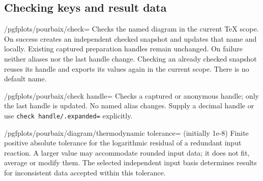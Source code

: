 \documentclass[a4paper,11pt]{ltxdoc}
\begin{document}
\subsection{Checking keys and result data}
\begin{key}{/pgfplots/pourbaix/check=}
Checks the named diagram in the current TeX scope. On success creates an
independent checked snapshot and updates that name and
\texttt{\string\pgfplotslastpourbaix} locally. Existing captured preparation handles
remain unchanged. On failure neither aliases nor the last handle change.
Checking an already checked snapshot reuses its handle and exports its values
again in the current scope. There is no default name.
\end{key}
\begin{key}{/pgfplots/pourbaix/check handle=}
Checks a captured or anonymous handle; only the last handle is updated.
No named alias changes. Supply a decimal handle or use
\texttt{check handle/.expanded=\string\myhandle} explicitly.
\end{key}
\begin{key}{/pgfplots/pourbaix/diagram/thermodynamic tolerance= (initially 1e-8)}
Finite positive absolute tolerance for the logarithmic residual of a redundant
input reaction. A larger value may accommodate rounded input data; it does not
fit, average or modify them. The selected independent input basis determines
results for inconsistent data accepted within this tolerance.
\end{key}
\end{document}
